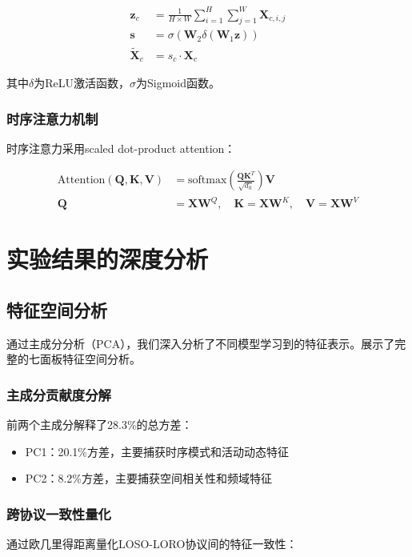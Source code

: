 \begin{align}
\mathbf{z}_c &= \frac{1}{H \times W} \sum_{i=1}^{H} \sum_{j=1}^{W} \mathbf{X}_{c,i,j} \\
\mathbf{s} &= \sigma(\mathbf{W}_2 \delta(\mathbf{W}_1 \mathbf{z})) \\
\tilde{\mathbf{X}}_c &= s_c \cdot \mathbf{X}_c
\end{align}

其中$\delta$为ReLU激活函数，$\sigma$为Sigmoid函数。

\subsubsection{时序注意力机制}
时序注意力采用scaled dot-product attention：

\begin{align}
\text{Attention}(\mathbf{Q}, \mathbf{K}, \mathbf{V}) &= \text{softmax}\left(\frac{\mathbf{Q}\mathbf{K}^T}{\sqrt{d_k}}\right)\mathbf{V} \\
\mathbf{Q} &= \mathbf{X}\mathbf{W}^Q, \quad \mathbf{K} = \mathbf{X}\mathbf{W}^K, \quad \mathbf{V} = \mathbf{X}\mathbf{W}^V
\end{align}

\section{实验结果的深度分析}
\label{sec:deep_analysis}

\subsection{特征空间分析}
\label{subsec:feature_space}

通过主成分分析（PCA），我们深入分析了不同模型学习到的特征表示。展示了完整的七面板特征空间分析。

\subsubsection{主成分贡献度分解}
前两个主成分解释了28.3\%的总方差：
\begin{itemize}
\item PC1：20.1\%方差，主要捕获时序模式和活动动态特征
\item PC2：8.2\%方差，主要捕获空间相关性和频域特征
\end{itemize}

\subsubsection{跨协议一致性量化}
通过欧几里得距离量化LOSO-LORO协议间的特征一致性：

